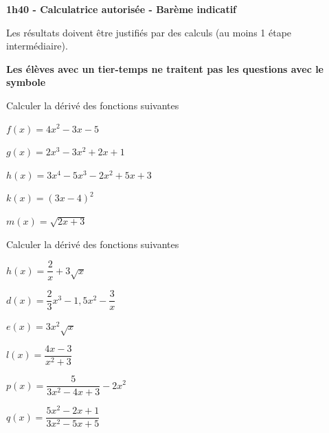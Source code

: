 \documentclass[12pt,a4paper]{article}  %
\begin{document}
\graphicspath{{../images/}}

\begin{center}

\end{center}


\begin{center}\textbf{1h40 - Calculatrice autorisée - Barème indicatif}\end{center}


\begin{center}
Les résultats doivent être justifiés par des calculs (au moins 1 étape intermédiaire).
\end{center}

\begin{center}\textbf{Les élèves avec un tier-temps ne traitent pas les questions avec  le symbole }\end{center}


Calculer la dérivé des fonctions suivantes
\begin{enumMet}
	\item $f(x)=4 x^{2}-3 x-5$
	\item {} $g(x)=2 x^{3}-3 x^{2}+2 x+1$
	\item $h(x)=3x^4-5x^3-2x^2+5x+3$
	\item {} $k(x)=(3x-4)^{2}$
	\item $m(x)=\sqrt{2x+3}$
\end{enumMet}


Calculer la dérivé des fonctions suivantes
\begin{enumMet}
	\item $h(x)=\dfrac{2}{x}+3 \sqrt{x}$
	\item $d(x)=\dfrac{2}{3} x^{3}-1,5 x^{2}-\dfrac{3}{x}$
	\item $e(x)=3 x^{2} \sqrt{x}$
	\item $l(x)=\dfrac{4x-3}{x^{2}+3}$
	\item $p(x)=\dfrac{5}{3x^2-4x+3}-2x^2$
	\item $q(x)=\dfrac{5x^2-2x+1}{3x^2-5x+5}$
\end{enumMet}
\end{document}
